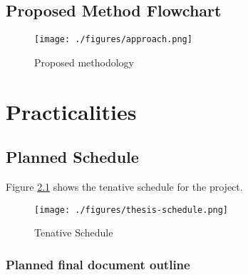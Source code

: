 \section{Proposed Method Flowchart}

\begin{figure}
      \centering
      \texttt{[image: ./figures/approach.png]}
      \caption{Proposed methodology}
      \label{method-flowchart}
\end{figure}

\chapter{Practicalities}

\section{Planned Schedule}

Figure \ref{project-schedule} shows the tenative schedule for the project. 
\begin{landscape}

      \begin{figure}
            \centering
            \texttt{[image: ./figures/thesis-schedule.png]}
            \caption{Tenative Schedule}
            \label{project-schedule}
      \end{figure}

\end{landscape}
\subsection{Planned final document outline}
